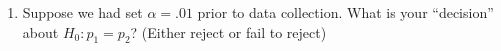 \begin{enumerate}
\begin{enumerate}
    \item%
      Suppose we had set $\alpha = .01$ prior to data collection. What
      is your ``decision'' about $H_0: p_1 = p_2$?  (Either reject or
      fail to reject) 
\begin{students}
 \ \   \vspace*{1cm}\\
\end{students}
\begin{key}

\end{key}
\end{enumerate}
\end{enumerate}
